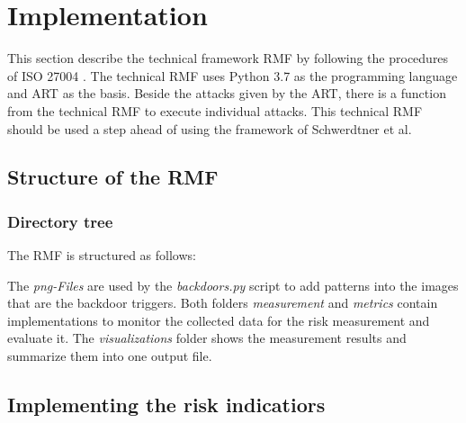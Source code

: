 \section{Implementation}
\label{sec:implementation}

This section describe the technical framework RMF by following the procedures of ISO 27004 \cite{ISO_27004_2009}. The technical RMF uses Python 3.7 as the programming language and ART as the basis. Beside the attacks given by the ART, there is a function from the technical RMF to execute individual attacks. This technical RMF should be used a step ahead of using the framework of Schwerdtner et al.

\subsection{Structure of the RMF}

\subsubsection*{Directory tree}

The RMF is structured as follows: \\


\break \noindent The \textit{png-Files} are used by the \textit{backdoors.py} script to add patterns into the images that are the backdoor triggers. Both folders \textit{measurement} and \textit{metrics} contain implementations to monitor the collected data for the risk measurement and evaluate it. The \textit{visualizations} folder shows the measurement results and summarize them into one output file.

\subsection{Implementing the risk indicatiors}

